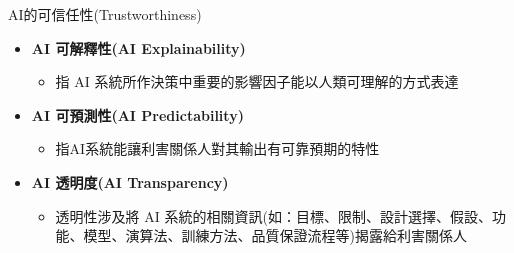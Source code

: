 \documentclass[aspectratio=1610]{Common/MyCourseBeamer}
\begin{document}
\begin{frame}[allowframebreaks]{AI的可信任性(Trustworthiness)\cite{ISO22989:2022}}
\begin{itemize}
		\item \textbf{AI 可解釋性(AI Explainability)}
		\begin{itemize}
			\item 指 AI 系統所作決策中重要的影響因子能以人類可理解的方式表達
			
			
		\end{itemize}
		\framebreak
		\item \textbf{AI 可預測性(AI Predictability)}
		\begin{itemize}
			\item 指AI系統能讓利害關係人對其輸出有可靠預期的特性
			
			
		\end{itemize}
		
		\item \textbf{AI 透明度(AI Transparency)}
		\begin{itemize}
			\item 透明性涉及將 AI 系統的相關資訊(如：目標、限制、設計選擇、假設、功能、模型、演算法、訓練方法、品質保證流程等)揭露給利害關係人
			
			

\end{itemize}
\end{itemize}
\end{frame}
\end{document}
